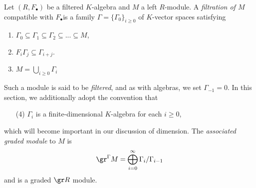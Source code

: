 \begin{defn}\label{defn:filtered-module}	
	Let $(R,F_\bullet)$ be a filtered $K$-algebra and $M$ a left $R$-module. A \emph{filtration of $M$} compatible with $F_\bullet$is a family $\Gamma = \{\Gamma_0\}_{i\geq 0}$ of $K$-vector spaces satisfying
	\begin{enumerate}[(1)]
		\item $\Gamma_0 \subseteq \Gamma_1 \subseteq \Gamma_2 \subseteq ... \subseteq M$,
		\item $F_i\Gamma_j \subseteq \Gamma_{i+j}$.
		\item $M = \bigcup_{i\geq 0} \Gamma_i$
	\end{enumerate}
	Such a module is said to be \emph{filtered}, and as with algebras, we set $\Gamma_{-1} = 0$. In this section, we additionally adopt the convention that
	\begin{enumerate}
		\item[(4)] $\Gamma_i$ is a finite-dimensional $K$-algebra for each $i \geq 0$,
	\end{enumerate}
	which will become important in our discussion of dimension. The \emph{associated graded module} to $M$ is
	\begin{align*}
		\gr^{\Gamma} M = \bigoplus_{i=0}^\infty \Gamma_i/\Gamma_{i-1}
	\end{align*}
	and is a graded $\gr R$ module.
\end{defn}

